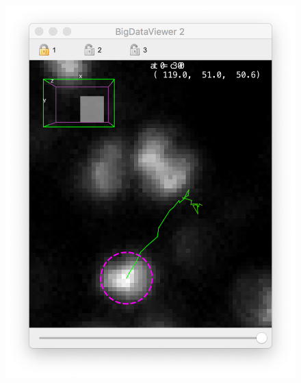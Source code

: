 \begin{figure}
    \centering
    \null\hfill
    \includegraphics[height=0.2\textheight]{figures/Mastodon_Tracklets_03.png}
    \hfill

\end{figure}
